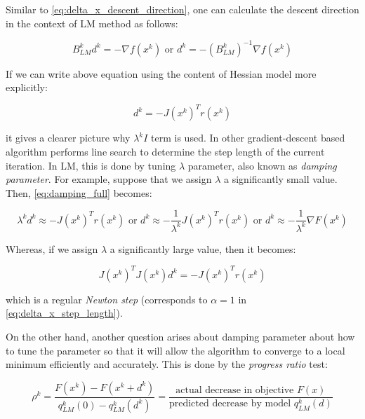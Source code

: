 \documentclass[a4paper]{report}
\numberwithin{figure}{section}
\begin{document}
Similar to \ref{eq:delta_x_descent_direction}, one can calculate the descent direction 
in the context of LM method as follows:

\begin{equation}
  B_{LM}^kd^k = - \nabla f(x^k) \text{ or } d^k = - (B_{LM}^k)^{-1}\nabla f(x^k)
\end{equation}\label{eq:lm_descent_direction}

If we can write above equation using the content of Hessian model more explicitly: 

\begin{equation}
  [J(x^k)^TJ(x^k) + \lambda^kI]d^k = -J(x^k)^Tr(x^k)
\end{equation}\label{eq:damping_full}

it gives a clearer picture why $\lambda^kI$ term is used. In other gradient-descent 
based algorithm performs line search to determine the step length of the current 
iteration. In LM, this is done by tuning $\lambda$ parameter, also known as 
\textit{damping parameter}. For example, suppose that we assign $\lambda$ 
a significantly small value. Then, \ref{eq:damping_full} becomes:

\begin{equation}
  \lambda^kd^k \approx -J(x^k)^Tr(x^k) \text{ or } 
  d^k \approx -\frac{1}{\lambda^k}J(x^k)^Tr(x^k)\text{ or } 
  d^k \approx -\frac{1}{\lambda^k}\nabla F(x^k)
\end{equation}

Whereas, if we assign $\lambda$ a significantly large value, then it becomes:

\begin{equation}
  J(x^k)^TJ(x^k)d^k = -J(x^k)^Tr(x^k)
\end{equation}

which is a regular \textit{Newton step} (corresponds to $\alpha=1$ in \ref{eq:delta_x_step_length}).

On the other hand, another question arises about damping parameter about how to tune the parameter 
so that it will allow the algorithm to converge to a local minimum efficiently 
and accurately. This is done by the \textit{progress ratio} test:

\begin{equation}
  \rho^k = \frac{F(x^k) - F(x^k+d^k)}{q_{LM}^k(0)-q_{LM}^k(d^k)} =
  \frac{\text{actual decrease in objective } F(x)}
  {\text{predicted decrease by model } q_{LM}^k(d)}
\end{equation}\label{eq:lm_progress_ration}
\end{document}
